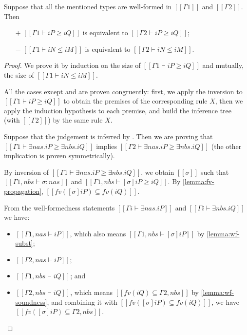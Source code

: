 \begin{lemma}
  \label{lemma:subt-ctxt-irrelevance}
  Suppose that all the mentioned types are well-formed in $[[Γ1]]$ and $[[Γ2]]$. 
  Then 
  \begin{enumerate}
    \item[$+$] $[[Γ1 ⊢ iP ≥ iQ]]$ is equivalent to $[[Γ2 ⊢ iP ≥ iQ]]$;
    \item[$-$] $[[Γ1 ⊢ iN ≤ iM]]$ is equivalent to $[[Γ2 ⊢ iN ≤ iM]]$.
  \end{enumerate}
\end{lemma}
\begin{proof}
  We prove it by induction on 
  the size of $[[Γ1 ⊢ iP ≥ iQ]]$ and mutually,
  the size of $[[Γ1 ⊢ iN ≤ iM]]$.

  All the cases except  and 
  are proven congruently:
  first, we apply the inversion to $[[Γ1 ⊢ iP ≥ iQ]]$ to obtain the premises of the
  corresponding rule $X$, then we apply the induction hypothesis to each premise,
  and build the inference tree (with $[[Γ2]]$) by the same rule $X$. 

  Suppose that the judgement is inferred by .
  Then we are proving that $[[Γ1 ⊢ ∃nas.iP ≥ ∃nbs.iQ]]$ implies 
  $[[Γ2 ⊢ ∃nas.iP ≥ ∃nbs.iQ]]$ (the other implication is proven symmetrically).

  By inversion  of $[[Γ1 ⊢ ∃nas.iP ≥ ∃nbs.iQ]]$, 
  we obtain $[[σ]]$ such that $[[ Γ1, nbs ⊢ σ :{nas}]]$
  and $[[Γ1, nbs ⊢ [σ]iP ≥ iQ]]$.
  By \cref{lemma:fv-propagation}, $[[fv([σ]iP) ⊆ fv(iQ)]]$.

  From the well-formedness statements 
  $[[Γi ⊢ ∃nas.iP]]$ and $[[Γi ⊢ ∃nbs.iQ]]$ we have:
  \begin{itemize}
    \item $[[Γ1, nas ⊢ iP]]$, which also means $[[Γ1, nbs ⊢ [σ]iP]]$
      by \cref{lemma:wf-subst};
    \item $[[Γ2, nas ⊢ iP]]$;
    \item $[[Γ1, nbs ⊢ iQ]]$; and 
    \item $[[Γ2, nbs ⊢ iQ]]$, which means $[[ fv(iQ) ⊆ Γ2, nbs ]]$
      by \cref{lemma:wf-soundness},
      and  combining it with $[[fv([σ]iP) ⊆ fv(iQ)]]$, 
      we have $[[fv([σ]iP) ⊆ Γ2, nbs]]$.
  \end{itemize}


\end{proof}

